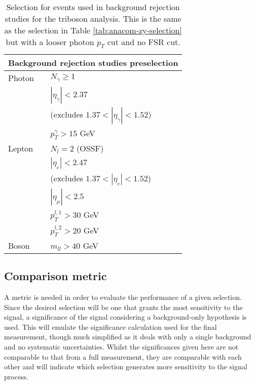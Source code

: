 \begin{table}
  \centering
  \renewcommand\arraystretch{1.3}
  \caption{
    Selection for events used in background rejection studies for the \VZy
    triboson analysis. This is the same as the \Zy selection in Table
    \ref{tab:anacom-zy-selection} but with a looser photon $p_T$ cut and no
    \ac{FSR} cut.
  }
  \begin{tabular}{p{6em}l}
    \hline\hline
    \multicolumn{2}{c}{Background rejection studies preselection} \\
    \hline
    Photon & $N_\gamma \geq 1$ \\
           & $|\eta_\gamma| < 2.37$ \\
           & (excludes $1.37 < |\eta_\gamma| < 1.52$) \\
           & $p_T^\gamma > 15$ GeV \\
    \hline
    Lepton & $N_l = 2$ (OSSF)\\
           & $|\eta_e| < 2.47$ \\
           & (excludes $1.37 < |\eta_e| < 1.52$) \\
           & $|\eta_\mu| < 2.5$ \\
           & $p_T^{l,1} > 30$ GeV \\
           & $p_T^{l,2} > 20$ GeV \\
    \hline
    Boson  & $m_{ll} > 40$ GeV \\
    \hline\hline
  \end{tabular}
  \label{tab:vzy-bdt-preliminaryselection}
\end{table}

\subsection{Comparison metric}
\label{sec:vzy-bdt-significance}

A metric is needed in order to evaluate the performance of a given selection.
Since the desired selection will be one that grants the most sensitivity to the
\VZy signal, a significance of the signal considering a background-only
hypothesis is used. This will emulate the significance calculation used for the
final measurement, though much simplified as it deals with only a single
background and no systematic uncertainties. Whilst the significances given here
are not comparable to that from a full measurement, they are comparable with
each other and will indicate which selection generates more sensitivity to the
signal process.

